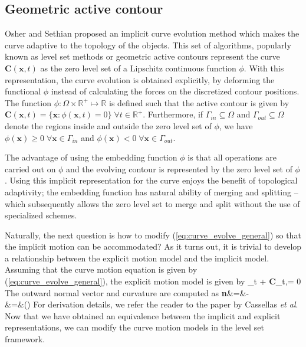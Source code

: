 \subsection{Geometric active contour}
Osher and Sethian\cite{osher_sethian} proposed an implicit curve evolution method which makes the curve adaptive to the topology of the objects. This set of algorithms, popularly known as level set methods or geometric active contours represent the curve $\textbf{C}(\textbf{x},t)$  as the zero level set of a Lipschitz continuous function $\phi$. With this representation, the curve evolution is obtained explicitly, by  deforming the functional $\phi$ instead of calculating the forces on the discretized contour positions. The function $\phi:\Omega\times\mathbb{R}^+\mapsto\mathbb{R}$ is defined such that the active contour is given by $\textbf{C}(\textbf{x},t)=\lbrace\textbf{x}:\phi(\textbf{x},t)=0\rbrace\;\forall t\in\mathbb{R}^+$. Furthermore, if $\Gamma_{in}\subseteq\Omega$ and $\Gamma_{out}\subseteq\Omega$ denote the regions inside and outside the zero level set of $\phi$, we have $\phi(\textbf{x}) \geq 0\; \forall \textbf{x}\in\Gamma_{in}$ and  $\phi(\textbf{x}) < 0\; \forall \textbf{x}\in\Gamma_{out}$.

The advantage of using the embedding function $\phi$ is that all operations are carried out on $\phi$ and the evolving contour is represented by the zero level set of $\phi$. Using this implicit representation for the curve enjoys the benefit of topological adaptivity; the embedding function has natural ability of merging and splitting -- which subsequently allows the zero level set to merge and split without the use of specialized schemes. 

Naturally, the next question is how to modify (\ref{eq:curve_evolve_general}) so that the implicit motion can be accommodated? As it turns out, it is trivial to develop a relationship between the explicit motion model and the implicit model. Assuming that the curve motion equation is given by (\ref{eq:curve_evolve_general}), the explicit motion model is given by
\bea
\phi_t + \langle\textbf{C}_t,\nabla\phi \rangle = 0
\label{eq:explicit_motion_ls}
\eea
The outward normal vector and curvature are computed as
\bea
\textbf{n}&=&-\dfrac{\nabla\phi}{|\nabla\phi|}\\
\kappa&=&\left(\dfrac{\nabla\phi}{|\nabla\phi|}\right)
\label{eq:normal_curvature_ls}
\eea
For derivation details, we refer the reader to the paper by Cassellas \textit{et al}\cite{caselles_GAC}. Now that we have obtained an equivalence between the implicit and explicit representations, we can modify the curve motion models in the level set framework. 

